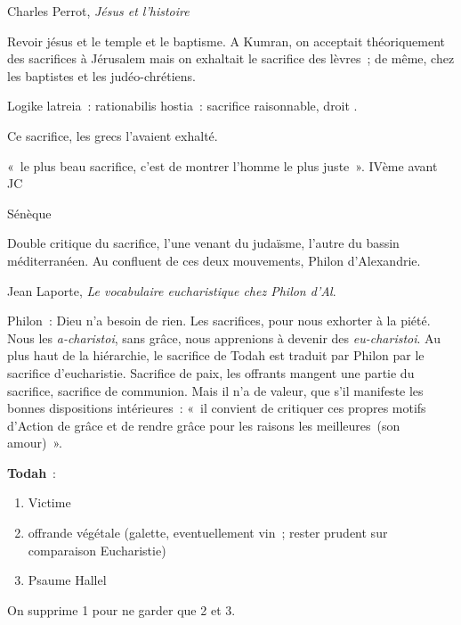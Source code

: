 Charles Perrot, \emph{Jésus et l'histoire}

Revoir jésus et le temple et le baptisme. A Kumran, on acceptait
théoriquement des sacrifices à Jérusalem mais on exhaltait le sacrifice
des lèvres~; de même, chez les baptistes et les judéo-chrétiens.

Logike latreia~: rationabilis hostia~: sacrifice raisonnable, droit .

Ce sacrifice, les grecs l'avaient exhalté.

«~le plus beau sacrifice, c'est de montrer l'homme le plus juste~».
IVème avant JC

Sénèque

Double critique du sacrifice, l'une venant du judaïsme, l'autre du
bassin méditerranéen. Au confluent de ces deux mouvements, Philon
d'Alexandrie.

Jean Laporte, \emph{Le vocabulaire eucharistique chez Philon d'Al}.

Philon~: Dieu n'a besoin de rien. Les sacrifices, pour nous exhorter à
la piété. Nous les \emph{a-charistoi}, sans grâce, nous apprenions à
devenir des \emph{eu-charistoi}. Au plus haut de la hiérarchie, le
sacrifice de Todah est traduit par Philon par le sacrifice
d'eucharistie. Sacrifice de paix, les offrants mangent une partie du
sacrifice, sacrifice de communion. Mais il n'a de valeur, que s'il
manifeste les bonnes dispositions intérieures~: «~il convient de
critiquer ces propres motifs d'Action de grâce et de rendre grâce pour
les raisons les meilleures~(son amour)~».

\textbf{Todah}~:

\begin{enumerate}
\def\labelenumi{\arabic{enumi}.}
\item
   
  Victime
   
\item
   
  offrande végétale (galette, eventuellement vin~; rester prudent sur
  comparaison Eucharistie)
   
\item
   
  Psaume Hallel
   
\end{enumerate}

On supprime 1 pour ne garder que 2 et 3.

